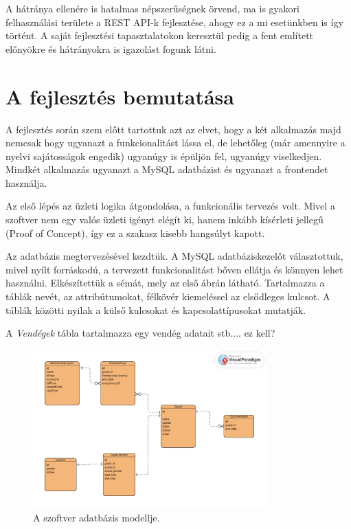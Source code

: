 \documentclass[12pt]{article}
\begin{document}
A hátránya ellenére is hatalmas népszerűségnek örvend, ma is gyakori felhasználási területe a REST API-k fejlesztése, ahogy ez a mi esetünkben is így történt. A saját fejlesztési tapasztalatokon keresztül pedig a fent említett előnyökre és hátrányokra is igazolást fogunk látni.

\newpage
\section{A fejlesztés bemutatása}

A fejlesztés során szem előtt tartottuk azt az elvet,  hogy a két alkalmazás majd nemcsak hogy ugyanazt a funkcionalitást lássa el, de lehetőleg (már amennyire a nyelvi sajátosságok engedik) ugyanúgy is épüljön fel, ugyanúgy viselkedjen.  Mindkét alkalmazás ugyanazt a MySQL adatbázist és ugyanazt a frontendet használja.

Az első lépés az üzleti logika átgondolása, a funkcionális tervezés volt. Mivel a szoftver nem egy valós üzleti igényt elégít ki, hanem inkább kísérleti jellegű (Proof of Concept), így ez a szakasz kisebb hangsúlyt kapott.

Az adatbázis megtervezésével kezdtük. A MySQL adatbáziskezelőt választottuk, mivel nyílt forráskodú, a tervezett funkcionalitást bőven ellátja és könnyen lehet használni. Elkészítettük a sémát, mely az első ábrán látható. Tartalmazza a táblák nevét,  az attribútumokat,  félkövér kiemeléssel az elsődleges kulcsot. A táblák közötti nyilak a külső kulcsokat és kapcsolattípusokat mutatják.

A \textit{Vendégek} tábla tartalmazza egy vendég adatait stb.... ez kell?

\begin{figure}[h!]
\centering
\includegraphics[width=0.8\textwidth]{database}
\caption{A szoftver adatbázis modellje.}
\end{figure}
\end{document}
